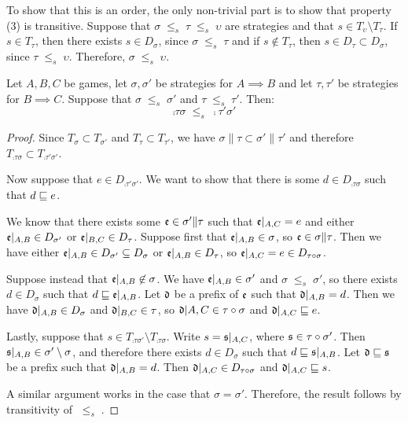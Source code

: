 \documentclass{article}
\newcommand{\stle}{{\;\le_s\;}}
\begin{document}
To show that this is an order, the only non-trivial part is to show that property (3) is transitive.  Suppose that $\sigma\stle\tau\stle\upsilon$ are strategies and that $s\in T_\upsilon\setminus T_\tau$.  If $s\in T_\tau$, then there exists $s\in D_\sigma$, since $\sigma\stle\tau$ and if $s\not\in T_\tau$, then $s\in D_\tau\subset D_\sigma$, since $\tau\stle\upsilon$.  Therefore, $\sigma\stle\upsilon$.

\begin{proposition}
  Let $A,B,C$ be games, let $\sigma,\sigma'$ be strategies for $A\implies B$ and let $\tau,\tau'$ be strategies for $B\implies C$.  Suppose that $\sigma\stle\sigma'$ and $\tau\stle\tau'$.  Then:
  \[
    \comp\tau\sigma\stle\comp{\tau'}{\sigma'}
    \]
  \begin{proof}
    Since $T_\sigma\subset T_{\sigma'}$ and $T_\tau\subset T_{\tau'}$, we have $\sigma\|\tau\subset\sigma'\|\tau'$ and therefore $T_{\comp\tau\sigma}\subset T_{\comp{\tau'}{\sigma'}}$.  

    Now suppose that $e\in D_{\comp{\tau'}{\sigma'}}$.  We want to show that there is some $d\in D_{\comp\tau\sigma}$ such that $d\sqsubseteq e$.  

    We know that there exists some $\mathfrak e\in\sigma'\|\tau$ such that $\mathfrak e\vert_{A,C}=e$ and either $\mathfrak e\vert_{A,B}\in D_{\sigma'}$ or $\mathfrak e\vert_{B,C}\in D_\tau$.  Suppose first that $\mathfrak e\vert_{A,B}\in\sigma$, so $\mathfrak e\in\sigma\|\tau$.  Then we have either $\mathfrak e\vert_{A,B}\in D_{\sigma'}\subseteq D_\sigma$ or $\mathfrak e\vert_{A,B}\in D_\tau$, so $\mathfrak e\vert_{A,C}=e\in D_{\tau \circ \sigma}$.  

    Suppose instead that $\mathfrak e\vert_{A,B}\not\in\sigma$.  We have $\mathfrak e\vert_{A,B}\in\sigma'$ and $\sigma\stle\sigma'$, so there exists $d\in D_\sigma$ such that $d\sqsubseteq\mathfrak e\vert_{A,B}$.  Let $\mathfrak d$ be a prefix of $\mathfrak e$ such that $\mathfrak d\vert_{A,B}=d$.  Then we have $\mathfrak d\vert_{A,B}\in D_\sigma$ and $\mathfrak d\vert_{B,C}\in\tau$, so $\mathfrak d\vert{A,C}\in\tau \circ \sigma$ and $\mathfrak d\vert_{A,C}\sqsubseteq e$.  

    Lastly, suppose that $s\in T_{\comp\tau{\sigma'}}\setminus T_{\comp\tau\sigma}$.  Write $s=\mathfrak s\vert_{A,C}$, where $\mathfrak s\in\tau \circ \sigma'$.  Then $\mathfrak s\vert_{A,B}\in\sigma'\setminus\sigma$, and therefore there exists $d\in D_\sigma$ such that $d\sqsubseteq\mathfrak s\vert_{A,B}$.  Let $\mathfrak d\sqsubseteq\mathfrak s$ be a prefix such that $\mathfrak d\vert_{A,B}=d$.  Then $\mathfrak d\vert_{A,C}\in D_{\tau \circ \sigma}$ and $\mathfrak d\vert_{A,C}\sqsubseteq s$.

    A similar argument works in the case that $\sigma=\sigma'$.  Therefore, the result follows by transitivity of $\stle$.
  \end{proof}
\end{proposition}
\end{document}
